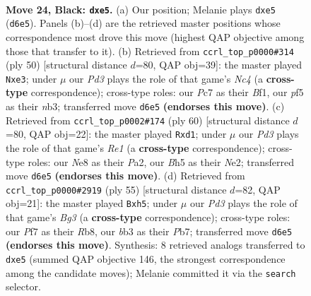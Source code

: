 \documentclass[11pt]{article}
\begin{document}
\clearpage

\begin{figure}[p]\centering
\begin{subfigure}{0.46\textwidth}\centering
\resizebox{\linewidth}{!}{%
\newchessgame
\chessboard[
  setfen={1r2n1k1/2p2ppp/p2p4/4RP1b/2P4n/PB6/6P1/RNB3K1 b - - 0 24},
  showmover=false,
  pgfstyle=straightmove, color=movearrow, markmove={d6-e5}
]}
\caption{}
\end{subfigure}\hfill
\begin{subfigure}{0.46\textwidth}\centering
\resizebox{\linewidth}{!}{%
\newchessgame
\chessboard[
  setfen={6k1/3bbp2/3p2pp/3Pp3/2N1P3/Pn2rN2/5PPP/5BK1 w - - 0 26},
  showmover=false,
  pgfstyle=straightmove, color=movearrow, markmove={c4-e3}
]}
\caption{}
\end{subfigure}
\\[4pt]
\begin{subfigure}{0.46\textwidth}\centering
\resizebox{\linewidth}{!}{%
\newchessgame
\chessboard[
  setfen={5k2/p1r1bn1p/1pB1ppp1/7P/5PP1/1PP3B1/PK2N3/3rR3 w - - 0 31},
  showmover=false,
  pgfstyle=straightmove, color=movearrow, markmove={e1-d1}
]}
\caption{}
\end{subfigure}\hfill
\begin{subfigure}{0.46\textwidth}\centering
\resizebox{\linewidth}{!}{%
\newchessgame
\chessboard[
  setfen={1r6/1p1nk1p1/p2p1pb1/N2Pp1PR/2P5/5P2/PP2B3/2KR4 b - - 0 28},
  showmover=false,
  pgfstyle=straightmove, color=movearrow, markmove={g6-h5}
]}
\caption{}
\end{subfigure}
\caption{\textbf{Move 24, Black: \texttt{dxe5}.} (a) Our position; Melanie plays \texttt{dxe5} (\texttt{d6e5}). Panels (b)--(d) are the retrieved master positions whose correspondence most drove this move (highest QAP objective among those that transfer to it). (b) Retrieved from \texttt{ccrl\_top\_p0000\#314} (ply 50) [structural distance $d$=80, QAP obj=39]: the master played \texttt{Nxe3}; under $\mu$ our \emph{Pd3} plays the role of that game's \emph{Nc4} (a \textbf{cross-type} correspondence); cross-type roles: our \emph{P}c7 as their \emph{B}f1, our \emph{p}f5 as their \emph{n}b3; transferred move \texttt{d6e5} \textbf{(endorses this move)}. (c) Retrieved from \texttt{ccrl\_top\_p0002\#174} (ply 60) [structural distance $d$=80, QAP obj=22]: the master played \texttt{Rxd1}; under $\mu$ our \emph{Pd3} plays the role of that game's \emph{Re1} (a \textbf{cross-type} correspondence); cross-type roles: our \emph{N}e8 as their \emph{P}a2, our \emph{B}h5 as their \emph{N}e2; transferred move \texttt{d6e5} \textbf{(endorses this move)}. (d) Retrieved from \texttt{ccrl\_top\_p0000\#2919} (ply 55) [structural distance $d$=82, QAP obj=21]: the master played \texttt{Bxh5}; under $\mu$ our \emph{Pd3} plays the role of that game's \emph{Bg3} (a \textbf{cross-type} correspondence); cross-type roles: our \emph{P}f7 as their \emph{R}b8, our \emph{b}b3 as their \emph{P}b7; transferred move \texttt{d6e5} \textbf{(endorses this move)}. Synthesis: 8 retrieved analogs transferred to \texttt{dxe5} (summed QAP objective 146, the strongest correspondence among the candidate moves); Melanie committed it via the \texttt{search} selector.}
\label{fig:thought-m47}
\end{figure}
\end{document}
